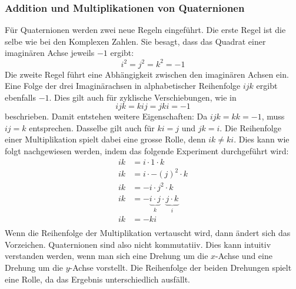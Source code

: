 \subsubsection{Addition und Multiplikationen von Quaternionen}
Für Quaternionen werden zwei neue Regeln eingeführt. Die erste 
Regel ist die selbe wie bei den Komplexen Zahlen. Sie besagt, dass 
das Quadrat einer imaginären Achse jeweils $-1$ ergibt:
\begin{equation*}
    i^2 = j^2 = k^2 = -1
\end{equation*}
Die zweite Regel führt eine Abhängigkeit zwischen den imaginären 
Achsen ein. Eine Folge der drei Imaginärachsen in alphabetischer 
Reihenfolge $ijk$ ergibt ebenfalls $-1$. Dies gilt auch für 
zyklische Verschiebungen, wie in
\begin{equation*}
    ijk = kij = jki = -1
\end{equation*}
beschrieben. Damit entstehen weitere Eigenschaften: Da $ijk = kk = 
-1$, muss $ij = k$ entsprechen. Dasselbe gilt auch für $ki = j$ und 
$jk = i$. Die Reihenfolge einer Multiplikation spielt dabei eine 
grosse Rolle, denn $ik \neq ki$. Dies kann wie folgt nachgewiesen 
werden, indem das folgende Experiment durchgeführt wird:
\begin{align*}
    ik &= i \cdot 1 \cdot k \\
    ik &= i \cdot -(j)^2 \cdot k \\
    ik &= -i \cdot j^2 \cdot k \\
    ik &= -\underbrace{i \cdot j}_k \cdot 
    \underbrace{j \cdot k}_{i} \\
    ik  &= -ki\\
\end{align*}
Wenn die Reihenfolge der Multiplikation vertauscht wird, dann 
ändert sich das Vorzeichen. Quaternionen sind also nicht 
kommutatiiv. Dies kann intuitiv verstanden werden, wenn man sich 
eine Drehung um die $x$-Achse und eine Drehung um die $y$-Achse 
vorstellt. Die Reihenfolge der beiden Drehungen spielt eine Rolle, 
da das Ergebnis unterschiedlich ausfällt.

